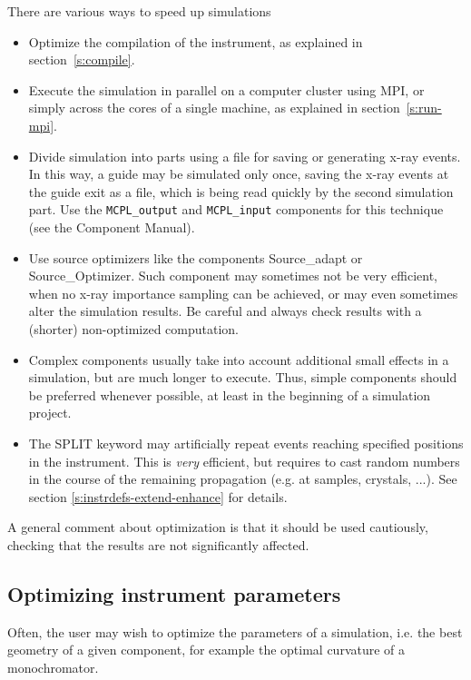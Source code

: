 There are various ways to speed up simulations
\begin{itemize}
\item Optimize the compilation of the instrument, as explained in
  section~\ref{s:compile}.
\item Execute the simulation in parallel on a computer cluster using MPI, or
  simply across the cores of a single machine, as explained in
  section~\ref{s:run-mpi}.
\item Divide simulation into parts using a file for saving or generating x-ray
  events. In this way, a guide may be simulated only once, saving the x-ray
  events at the guide exit as a file, which is being read quickly by the second
  simulation part. Use the \texttt{MCPL\_output} and \texttt{MCPL\_input}
  components for this technique (see the Component Manual).
\item Use source optimizers like the components Source\_adapt or
  Source\_Optimizer. Such component may sometimes not be very efficient, when no
  x-ray importance sampling can be achieved, or may even sometimes alter the
  simulation results. Be careful and always check results with a (shorter)
  non-optimized computation.
\item Complex components usually take into account additional small effects in a
  simulation, but are much longer to execute. Thus, simple components should be
  preferred whenever possible, at least in the beginning of a simulation project.
\item The SPLIT keyword may artificially repeat events reaching specified
  positions in the instrument. This is \emph{very} efficient, but requires to
  cast random numbers in the course of the remaining propagation (e.g. at
  samples, crystals, ...). See section \ref{s:instrdefs-extend-enhance} for
  details.
\end{itemize}
A general comment about optimization is that it should be used cautiously,
checking that the results are not significantly affected.

\subsection{Optimizing instrument parameters}
\label{s:optimize}
Often, the user may wish to optimize the parameters of a simulation, i.e. the
best geometry of a given component, for example the optimal curvature of a
monochromator.

